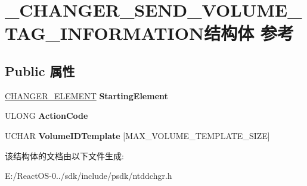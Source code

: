 \hypertarget{struct___c_h_a_n_g_e_r___s_e_n_d___v_o_l_u_m_e___t_a_g___i_n_f_o_r_m_a_t_i_o_n}{}\section{\+\_\+\+C\+H\+A\+N\+G\+E\+R\+\_\+\+S\+E\+N\+D\+\_\+\+V\+O\+L\+U\+M\+E\+\_\+\+T\+A\+G\+\_\+\+I\+N\+F\+O\+R\+M\+A\+T\+I\+O\+N结构体 参考}
\label{struct___c_h_a_n_g_e_r___s_e_n_d___v_o_l_u_m_e___t_a_g___i_n_f_o_r_m_a_t_i_o_n}
\subsection*{Public 属性}
\begin{DoxyCompactItemize}
\item 
\mbox{\label{struct___c_h_a_n_g_e_r___s_e_n_d___v_o_l_u_m_e___t_a_g___i_n_f_o_r_m_a_t_i_o_n_aaea29752713d9e0ac6a505427d3bb999}} 
\hyperlink{struct___c_h_a_n_g_e_r___e_l_e_m_e_n_t}{C\+H\+A\+N\+G\+E\+R\+\_\+\+E\+L\+E\+M\+E\+NT} {\bfseries Starting\+Element}
\item 
\mbox{\label{struct___c_h_a_n_g_e_r___s_e_n_d___v_o_l_u_m_e___t_a_g___i_n_f_o_r_m_a_t_i_o_n_a93f0c0e56d936b9d5aafe18af350714b}} 
U\+L\+O\+NG {\bfseries Action\+Code}
\item 
\mbox{\label{struct___c_h_a_n_g_e_r___s_e_n_d___v_o_l_u_m_e___t_a_g___i_n_f_o_r_m_a_t_i_o_n_a456f5fb694c3d56e5608d9f8dccc7905}} 
U\+C\+H\+AR {\bfseries Volume\+I\+D\+Template} \mbox{[}M\+A\+X\+\_\+\+V\+O\+L\+U\+M\+E\+\_\+\+T\+E\+M\+P\+L\+A\+T\+E\+\_\+\+S\+I\+ZE\mbox{]}
\end{DoxyCompactItemize}


该结构体的文档由以下文件生成\+:\begin{DoxyCompactItemize}
\item 
E\+:/\+React\+O\+S-\/0../sdk/include/psdk/ntddchgr.\+h\end{DoxyCompactItemize}
